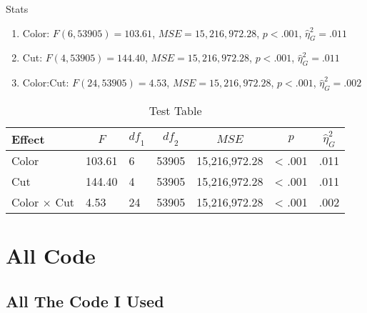 \documentclass[10pt,ignorenonframetext,,aspectratio=149]{beamer}
\providecommand{\tightlist}{%
  \setlength{\itemsep}{0pt}\setlength{\parskip}{0pt}}
\begin{document}
\begin{frame}{Stats}
\protect\hypertarget{stats}{}
\begin{enumerate}
\tightlist
\item
  Color: \(F(6, 53905) = 103.61\), \(\mathit{MSE} = 15,216,972.28\),
  \(p < .001\), \(\hat{\eta}^2_G = .011\)
\item
  Cut: \(F(4, 53905) = 144.40\), \(\mathit{MSE} = 15,216,972.28\),
  \(p < .001\), \(\hat{\eta}^2_G = .011\)
\item
  Color:Cut: \(F(24, 53905) = 4.53\), \(\mathit{MSE} = 15,216,972.28\),
  \(p < .001\), \(\hat{\eta}^2_G = .002\)
\end{enumerate}

\begin{table}[tbp]
\begin{center}
\begin{threeparttable}
\caption{\label{tab:unnamed-chunk-4}Test Table}
\begin{tabular}{lllllll}
\toprule
Effect & \multicolumn{1}{c}{$F$} & \multicolumn{1}{c}{$\mathit{df}_1$} & \multicolumn{1}{c}{$\mathit{df}_2$} & \multicolumn{1}{c}{$\mathit{MSE}$} & \multicolumn{1}{c}{$p$} & \multicolumn{1}{c}{$\hat{\eta}^2_G$}\\
\midrule
Color & 103.61 & 6 & 53905 & 15,216,972.28 & < .001 & .011\\
Cut & 144.40 & 4 & 53905 & 15,216,972.28 & < .001 & .011\\
Color $\times$ Cut & 4.53 & 24 & 53905 & 15,216,972.28 & < .001 & .002\\
\bottomrule
\end{tabular}
\end{threeparttable}
\end{center}
\end{table}
\end{frame}

\hypertarget{all-code}{%
\section*{All Code}\label{all-code}}

\hypertarget{all-the-code-i-used}{%
\subsection*{All The Code I Used}\label{all-the-code-i-used}}
\end{document}
